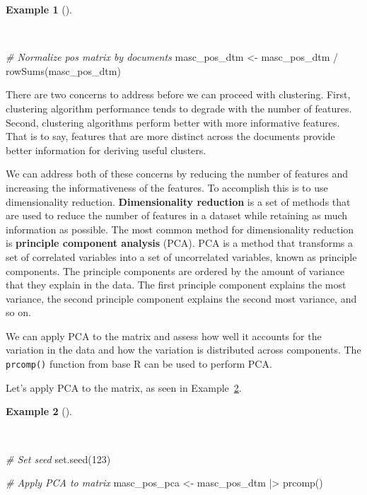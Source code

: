 \documentclass[
  letterpaper,
]{book}
\newenvironment{Shaded}{\begin{snugshade}}{\end{snugshade}}
\newcommand{\CommentTok}[1]{\textcolor[rgb]{0.00,0.00,0.00}{\textit{#1}}}
\newcommand{\DecValTok}[1]{\textcolor[rgb]{0.00,0.00,0.00}{#1}}
\newcommand{\FunctionTok}[1]{\textcolor[rgb]{0.00,0.00,0.00}{#1}}
\newcommand{\NormalTok}[1]{\textcolor[rgb]{0.00,0.00,0.00}{#1}}
\newcommand{\OtherTok}[1]{\textcolor[rgb]{0.00,0.00,0.00}{#1}}
\newcommand{\SpecialCharTok}[1]{\textcolor[rgb]{0.00,0.00,0.00}{#1}}
\theoremstyle{definition}
\newtheorem{example}{Example}[chapter]
\theoremstyle{remark}
\begin{document}
\begin{example}[]\protect\hypertarget{exm-explore-masc-dtms-normalized}{}\label{exm-explore-masc-dtms-normalized}

~

\begin{Shaded}
\begin{Highlighting}[]
\CommentTok{\# Normalize pos matrix by documents}
\NormalTok{masc\_pos\_dtm }\OtherTok{\textless{}{-}}
\NormalTok{  masc\_pos\_dtm }\SpecialCharTok{/} \FunctionTok{rowSums}\NormalTok{(masc\_pos\_dtm)}
\end{Highlighting}
\end{Shaded}

\end{example}

There are two concerns to address before we can proceed with clustering.
First, clustering algorithm performance tends to degrade with the number
of features. Second, clustering algorithms perform better with more
informative features. That is to say, features that are more distinct
across the documents provide better information for deriving useful
clusters.

We can address both of these concerns by reducing the number of features
and increasing the informativeness of the features. To accomplish this
is to use dimensionality reduction. \textbf{Dimensionality reduction} is
a set of methods that are used to reduce the number of features in a
dataset while retaining as much information as possible. The most common
method for dimensionality reduction is \textbf{principle component
analysis} (PCA). PCA is a method that transforms a set of correlated
variables into a set of uncorrelated variables, known as principle
components. The principle components are ordered by the amount of
variance that they explain in the data. The first principle component
explains the most variance, the second principle component explains the
second most variance, and so on.

We can apply PCA to the matrix and assess how well it accounts for the
variation in the data and how the variation is distributed across
components. The \texttt{prcomp()} function from base R can be used to
perform PCA.

Let's apply PCA to the matrix, as seen in
Example~\ref{exm-explore-masc-dtms-pca}.

\begin{example}[]\protect\hypertarget{exm-explore-masc-dtms-pca}{}\label{exm-explore-masc-dtms-pca}

~

\begin{Shaded}
\begin{Highlighting}[]
\CommentTok{\# Set seed}
\FunctionTok{set.seed}\NormalTok{(}\DecValTok{123}\NormalTok{)}

\CommentTok{\# Apply PCA to matrix}
\NormalTok{masc\_pos\_pca }\OtherTok{\textless{}{-}}
\NormalTok{  masc\_pos\_dtm }\SpecialCharTok{|\textgreater{}}
  \FunctionTok{prcomp}\NormalTok{()}
\end{Highlighting}
\end{Shaded}

\end{example}
\end{document}

